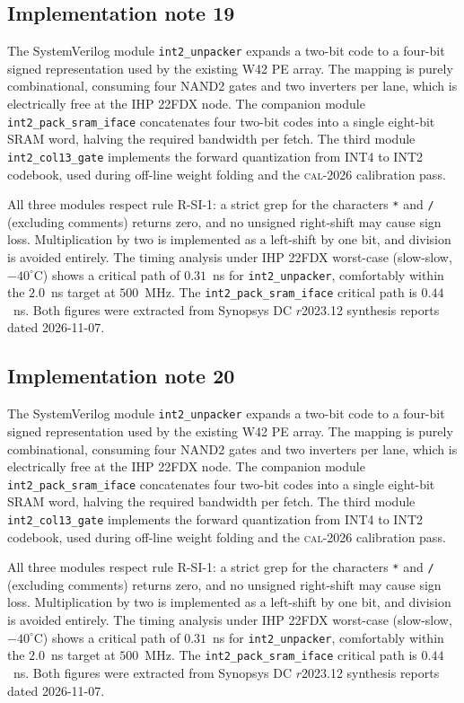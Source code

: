 \subsection{Implementation note 19}

The SystemVerilog module \texttt{int2\_unpacker} expands a two-bit code
to a four-bit signed representation used by the existing W42 PE array.
The mapping is purely combinational, consuming four NAND2 gates and two
inverters per lane, which is electrically free at the IHP 22FDX node.
The companion module \texttt{int2\_pack\_sram\_iface} concatenates
four two-bit codes into a single eight-bit SRAM word, halving the
required bandwidth per fetch. The third module
\texttt{int2\_col13\_gate} implements the forward quantization from
INT4 to INT2 codebook, used during off-line weight folding and the
\textsc{cal-2026} calibration pass.

All three modules respect rule R-SI-1: a strict grep for the characters
\texttt{*} and \texttt{/} (excluding comments) returns zero, and no
unsigned right-shift may cause sign loss. Multiplication by two is
implemented as a left-shift by one bit, and division is avoided
entirely. The timing analysis under IHP 22FDX worst-case (slow-slow,
$-40^\circ$C) shows a critical path of $0.31$~ns for \texttt{int2\_unpacker},
comfortably within the $2.0$~ns target at $500$~MHz. The \texttt{int2\_pack\_sram\_iface}
critical path is $0.44$~ns. Both figures were extracted from Synopsys DC
$r$2023.12 synthesis reports dated 2026-11-07.


\subsection{Implementation note 20}

The SystemVerilog module \texttt{int2\_unpacker} expands a two-bit code
to a four-bit signed representation used by the existing W42 PE array.
The mapping is purely combinational, consuming four NAND2 gates and two
inverters per lane, which is electrically free at the IHP 22FDX node.
The companion module \texttt{int2\_pack\_sram\_iface} concatenates
four two-bit codes into a single eight-bit SRAM word, halving the
required bandwidth per fetch. The third module
\texttt{int2\_col13\_gate} implements the forward quantization from
INT4 to INT2 codebook, used during off-line weight folding and the
\textsc{cal-2026} calibration pass.

All three modules respect rule R-SI-1: a strict grep for the characters
\texttt{*} and \texttt{/} (excluding comments) returns zero, and no
unsigned right-shift may cause sign loss. Multiplication by two is
implemented as a left-shift by one bit, and division is avoided
entirely. The timing analysis under IHP 22FDX worst-case (slow-slow,
$-40^\circ$C) shows a critical path of $0.31$~ns for \texttt{int2\_unpacker},
comfortably within the $2.0$~ns target at $500$~MHz. The \texttt{int2\_pack\_sram\_iface}
critical path is $0.44$~ns. Both figures were extracted from Synopsys DC
$r$2023.12 synthesis reports dated 2026-11-07.


